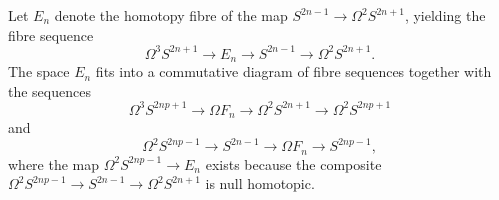 Let $E_n$ denote the homotopy fibre of the map $S^{2n-1} \to \Omega^2 S^{2n+1}$, yielding the fibre sequence
$$\Omega^3 S^{2n+1} \longrightarrow E_n \longrightarrow S^{2n-1} \longrightarrow \Omega^2 S^{2n+1}.$$
The space $E_n$ fits into a commutative diagram of fibre sequences together with the sequences
$$\Omega^3 S^{2np+1} \to \Omega F_n \to \Omega^2 S^{2n+1} \to \Omega^2 S^{2np+1}$$
and
$$\Omega^2 S^{2np-1} \to S^{2n-1} \to \Omega F_n \to S^{2np-1},$$
where the map $\Omega^2 S^{2np-1} \to E_n$ exists because the composite $\Omega^2 S^{2np-1} \to S^{2n-1} \to \Omega^2 S^{2n+1}$ is null homotopic.
